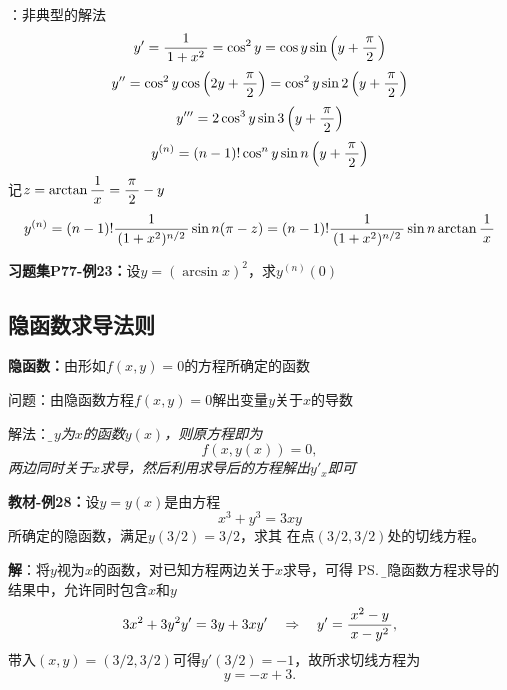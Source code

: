 \begin{shaded}
[提示]：非典型的解法
$$y'=\displaystyle\frac{\,{1}\,}{\,{1+x^2}\,}=\cos^2y=\cos y\sin\left(y+\displaystyle\frac{\,{\pi}\,}{\,{2}\,}\right)$$
$$y''=\cos^2y\cos\left(2y+\displaystyle\frac{\,{\pi}\,}{\,{2}\,}\right)=\cos^2y\sin2\left(y+\displaystyle\frac{\,{\pi}\,}{\,{2}\,}\right)$$
$$y'''=2\cos^3y\sin3\left(y+\displaystyle\frac{\,{\pi}\,}{\,{2}\,}\right)$$
$$y^{(n)}=(n-1)!\cos^ny\sin n\left(y+\displaystyle\frac{\,{\pi}\,}{\,{2}\,}\right)$$
记$z=\arctan\displaystyle\frac{\,{1}\,}{\,{x}\,}=\displaystyle\frac{\,{\pi}\,}{\,{2}\,}-y$
$$y^{(n)}=(n-1)!\displaystyle\frac{\,{1}\,}{\,{(1+x^2)^{n/2}}\,}\sin n(\pi-z)=
(n-1)!\displaystyle\frac{\,{1}\,}{\,{(1+x^2)^{n/2}}\,}\sin n\arctan\displaystyle\frac{\,{1}\,}{\,{x}\,}$$
\end{shaded}
{\bf 习题集P77-例23：}设$y=(\arcsin x)^2$，求$y^{(n)}(0)$

\subsection{隐函数求导法则}

{\bf 隐函数：}由形如$f(x,y)=0$的方程所确定的函数

问题：由隐函数方程$f(x,y)=0$解出变量$y$关于$x$的导数

解法：{\it\b 视$y$为$x$的函数$y(x)$，则原方程即为
$$f(x,y(x))=0,$$
两边同时关于$x$求导，然后利用求导后的方程解出$y'_x$即可
}

{\bf 教材-例28：}设$y=y(x)$是由方程
$$x^3+y^3=3xy$$
所确定的隐函数，满足$y(3/2)=3/2$，求其
在点$(3/2,3/2)$处的切线方程。

{\bf 解}：将$y$视为$x$的函数，对已知方程两边关于$x$求导，可得
\ps{\b 在隐函数方程求导的结果中，允许同时包含$x$和$y$}
$$3x^2+3y^2y'=3y+3xy'\quad\Rightarrow\quad
y'=\displaystyle\frac{\,{x^2-y}\,}{\,{x-y^2}\,},$$
带入$(x,y)=(3/2,3/2)$可得$y'(3/2)=-1$，故所求切线方程为
$$y=-x+3.$$

\begin{center}
\end{center}

